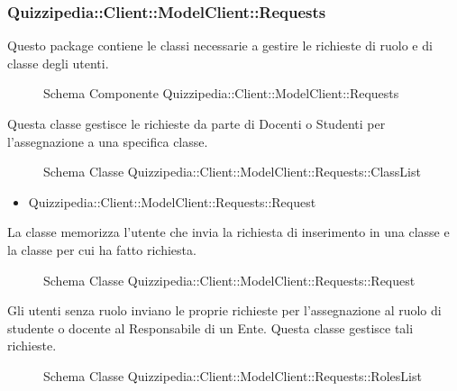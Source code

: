 \subsubsection{Quizzipedia::Client::ModelClient::Requests}
Questo package contiene le classi necessarie a gestire le richieste di ruolo e di classe degli utenti.
\begin{figure}[H]
\centering
\noindent{}
\caption{Schema Componente Quizzipedia::Client::ModelClient::Requests}
\end{figure}
Questa classe gestisce le richieste da parte di Docenti o Studenti per l'assegnazione a una specifica classe.
\begin{figure}[H]
\centering
\noindent{}
\caption{Schema Classe Quizzipedia::Client::ModelClient::Requests::ClassList}
\end{figure}
\begin{itemize}
\item Quizzipedia::Client::ModelClient::Requests::Request
\end{itemize}
La classe memorizza l'utente che invia la richiesta di inserimento in una classe e la classe per cui ha fatto richiesta.
\begin{figure}[H]
\centering
\noindent{}
\caption{Schema Classe Quizzipedia::Client::ModelClient::Requests::Request}
\end{figure}
Gli utenti senza ruolo inviano le proprie richieste per l'assegnazione al ruolo di studente o docente al Responsabile di un Ente. Questa classe gestisce tali richieste.
\begin{figure}[H]
\centering
\noindent{}
\caption{Schema Classe Quizzipedia::Client::ModelClient::Requests::RolesList}
\end{figure}

